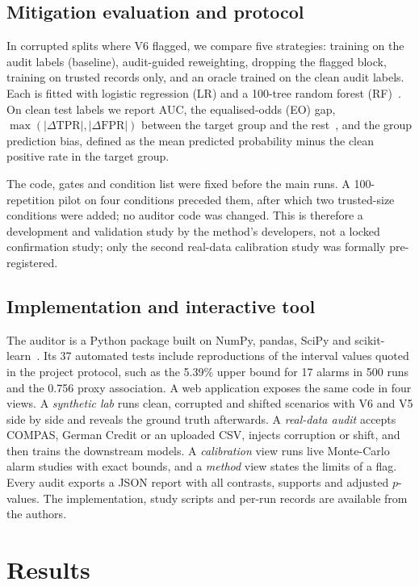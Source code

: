 \documentclass[conference]{IEEEtran}
\newcommand{\Vsix}{V6}
\newcommand{\Vfive}{V5}
\begin{document}
\subsection{Mitigation evaluation and protocol}
In corrupted splits where \Vsix{} flagged, we compare five strategies: training on the audit labels (baseline), audit-guided reweighting, dropping the flagged block, training on trusted records only, and an oracle trained on the clean audit labels. Each is fitted with logistic regression (LR) and a 100-tree random forest (RF)~\cite{pedregosa2011scikit}. On clean test labels we report AUC, the equalised-odds (EO) gap, $\max(|\Delta\mathrm{TPR}|,|\Delta\mathrm{FPR}|)$ between the target group and the rest~\cite{hardt2016equality}, and the group prediction bias, defined as the mean predicted probability minus the clean positive rate in the target group.

The code, gates and condition list were fixed before the main runs. A 100-repetition pilot on four conditions preceded them, after which two trusted-size conditions were added; no auditor code was changed. This is therefore a development and validation study by the method's developers, not a locked confirmation study; only the second real-data calibration study was formally pre-registered.

\subsection{Implementation and interactive tool}
The auditor is a Python package built on NumPy, pandas, SciPy and scikit-learn~\cite{pedregosa2011scikit}. Its 37 automated tests include reproductions of the interval values quoted in the project protocol, such as the 5.39\% upper bound for 17 alarms in 500 runs and the 0.756 proxy association. A web application exposes the same code in four views. A \emph{synthetic lab} runs clean, corrupted and shifted scenarios with \Vsix{} and \Vfive{} side by side and reveals the ground truth afterwards. A \emph{real-data audit} accepts COMPAS, German Credit or an uploaded CSV, injects corruption or shift, and then trains the downstream models. A \emph{calibration} view runs live Monte-Carlo alarm studies with exact bounds, and a \emph{method} view states the limits of a flag. Every audit exports a JSON report with all contrasts, supports and adjusted $p$-values. The implementation, study scripts and per-run records are available from the authors.

\section{Results}
\end{document}

